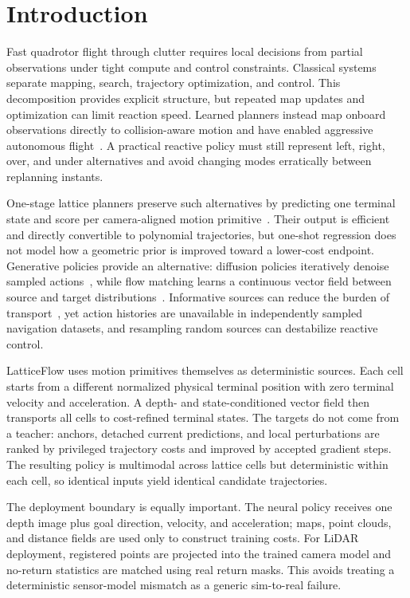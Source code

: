\section{Introduction}

Fast quadrotor flight through clutter requires local decisions from partial observations under tight compute and control constraints. Classical systems separate mapping, search, trajectory optimization, and control. This decomposition provides explicit structure, but repeated map updates and optimization can limit reaction speed. Learned planners instead map onboard observations directly to collision-aware motion and have enabled aggressive autonomous flight~\cite{loquercio2021learning}. A practical reactive policy must still represent left, right, over, and under alternatives and avoid changing modes erratically between replanning instants.

One-stage lattice planners preserve such alternatives by predicting one terminal state and score per camera-aligned motion primitive~\cite{lu2024yopo}. Their output is efficient and directly convertible to polynomial trajectories, but one-shot regression does not model how a geometric prior is improved toward a lower-cost endpoint. Generative policies provide an alternative: diffusion policies iteratively denoise sampled actions~\cite{chi2023diffusion}, while flow matching learns a continuous vector field between source and target distributions~\cite{lipman2023flow}. Informative sources can reduce the burden of transport~\cite{jia2026a2a}, yet action histories are unavailable in independently sampled navigation datasets, and resampling random sources can destabilize reactive control.

LatticeFlow uses motion primitives themselves as deterministic sources. Each cell starts from a different normalized physical terminal position with zero terminal velocity and acceleration. A depth- and state-conditioned vector field then transports all cells to cost-refined terminal states. The targets do not come from a teacher: anchors, detached current predictions, and local perturbations are ranked by privileged trajectory costs and improved by accepted gradient steps. The resulting policy is multimodal across lattice cells but deterministic within each cell, so identical inputs yield identical candidate trajectories.

The deployment boundary is equally important. The neural policy receives one depth image plus goal direction, velocity, and acceleration; maps, point clouds, and distance fields are used only to construct training costs. For LiDAR deployment, registered points are projected into the trained camera model and no-return statistics are matched using real return masks. This avoids treating a deterministic sensor-model mismatch as a generic sim-to-real failure.

